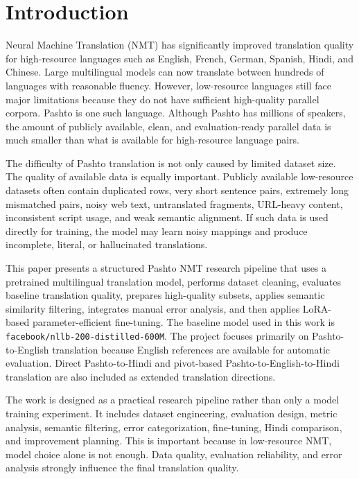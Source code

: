\documentclass[conference]{IEEEtran}
\begin{document}
\section{Introduction}

Neural Machine Translation (NMT) has significantly improved translation quality for high-resource languages such as English, French, German, Spanish, Hindi, and Chinese. Large multilingual models can now translate between hundreds of languages with reasonable fluency. However, low-resource languages still face major limitations because they do not have sufficient high-quality parallel corpora. Pashto is one such language. Although Pashto has millions of speakers, the amount of publicly available, clean, and evaluation-ready parallel data is much smaller than what is available for high-resource language pairs.

The difficulty of Pashto translation is not only caused by limited dataset size. The quality of available data is equally important. Publicly available low-resource datasets often contain duplicated rows, very short sentence pairs, extremely long mismatched pairs, noisy web text, untranslated fragments, URL-heavy content, inconsistent script usage, and weak semantic alignment. If such data is used directly for training, the model may learn noisy mappings and produce incomplete, literal, or hallucinated translations.

This paper presents a structured Pashto NMT research pipeline that uses a pretrained multilingual translation model, performs dataset cleaning, evaluates baseline translation quality, prepares high-quality subsets, applies semantic similarity filtering, integrates manual error analysis, and then applies LoRA-based parameter-efficient fine-tuning. The baseline model used in this work is \texttt{facebook/nllb-200-distilled-600M}. The project focuses primarily on Pashto-to-English translation because English references are available for automatic evaluation. Direct Pashto-to-Hindi and pivot-based Pashto-to-English-to-Hindi translation are also included as extended translation directions.

The work is designed as a practical research pipeline rather than only a model training experiment. It includes dataset engineering, evaluation design, metric analysis, semantic filtering, error categorization, fine-tuning, Hindi comparison, and improvement planning. This is important because in low-resource NMT, model choice alone is not enough. Data quality, evaluation reliability, and error analysis strongly influence the final translation quality.
\end{document}
